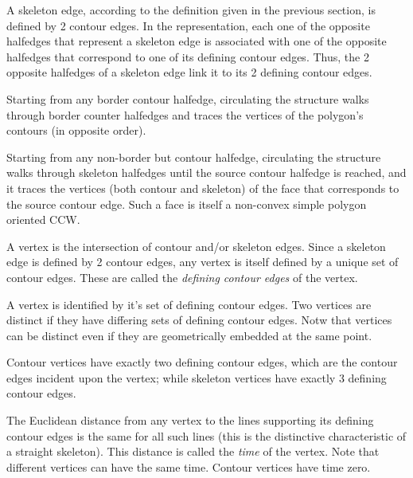 A skeleton edge, according to the definition given in the previous
section, is defined by 2 contour edges. In the representation, each
one of the opposite halfedges that represent a skeleton edge is
associated with one of the opposite halfedges that correspond to one
of its defining contour edges. Thus, the 2 opposite halfedges of a
skeleton edge link it to its 2 defining contour edges.

Starting from any border contour halfedge, circulating the structure
walks through border counter halfedges and traces the vertices of the
polygon's contours (in opposite order).

Starting from any non-border but contour halfedge, circulating the
structure walks through skeleton halfedges until the source contour
halfedge is reached, and it traces the vertices (both contour and
skeleton) of the face that corresponds to the source contour
edge. Such a face is itself a non-convex simple polygon oriented CCW.

A vertex is the intersection of contour and/or skeleton edges. Since a
skeleton edge is defined by 2 contour edges, any vertex is itself
defined by a unique set of contour edges. These are called the
{\em defining contour edges} of the vertex.

A vertex is identified by it's set of defining contour edges. Two
vertices are distinct if they have differing sets of defining contour
edges.  Notw that vertices can be distinct even if they are geometrically
embedded at the same point.
 
Contour vertices have exactly two defining contour edges, which are
the contour edges incident upon the vertex; while skeleton vertices
have exactly 3 defining contour edges.

The Euclidean distance from any vertex to the lines
supporting its defining contour edges is the same for all such lines
(this is the distinctive characteristic of a straight skeleton). This
distance is called the {\em time} of the vertex. Note that
different vertices can have the same time. Contour vertices have time
zero.

